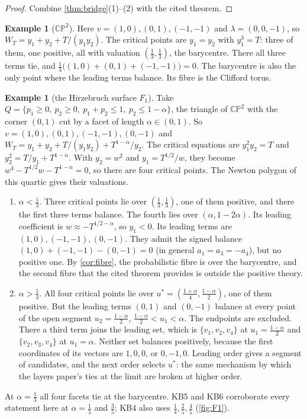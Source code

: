 \documentclass[11pt]{article}
\theoremstyle{definition}\newtheorem{definition}[theorem]{Definition}\newtheorem{remark}[theorem]{Remark}\newtheorem{example}[theorem]{Example}\newtheorem{problem}[theorem]{Open problem}\crefname{problem}{Problem}{Problems}
\begin{document}
\begin{proof}
Combine \cref{thm:bridge}(1)--(2) with the cited theorem.
\end{proof}

\begin{example}[$\mathbb{CP}^2$]\label{ex:CP2}
Here $v=(1,0),(0,1),(-1,-1)$ and $\lambda=(0,0,-1)$, so $W_T=y_1+y_2+T/(y_1y_2)$. The critical points are $y_1=y_2$ with $y_1^3=T$: three of them, one positive, all
with valuation $(\tfrac13,\tfrac13)$, the barycentre. There all three terms tie, and $\tfrac13\bigl((1,0)+(0,1)+(-1,-1)\bigr)=0$. The barycentre is also the only point where
the leading terms balance. Its fibre is the Clifford torus.
\end{example}

\begin{example}[the Hirzebruch surface $F_1$]\label{ex:F1}
Take $Q=\{p_1\ge0,\ p_2\ge0,\ p_1+p_2\le1,\ p_2\le1-\alpha\}$, the triangle of $\mathbb{CP}^2$ with the corner $(0,1)$ cut by a facet of length $\alpha\in(0,1)$. So
$v=(1,0),(0,1),(-1,-1),(0,-1)$ and $W_T=y_1+y_2+T/(y_1y_2)+T^{1-\alpha}/y_2$. The critical equations are $y_1^2y_2=T$ and $y_2^2=T/y_1+T^{1-\alpha}$. With $y_2=w^2$ and
$y_1=T^{1/2}/w$, they become $w^4-T^{1/2}w-T^{1-\alpha}=0$, so there are four critical points. The Newton polygon of this quartic gives their valuations.
\begin{enumerate}
\item[(a)] $\alpha<\tfrac13$. Three critical points lie over $(\tfrac13,\tfrac13)$, one of them positive, and there the first three terms balance. The fourth lies over
  $(\alpha,1-2\alpha)$. Its leading coefficient is $w\approx-T^{1/2-\alpha}$, so $y_1<0$. Its leading terms are $(1,0),(-1,-1),(0,-1)$. They admit the signed
  balance $(1,0)+(-1,-1)-(0,-1)=0$ (in general $a_1=a_3=-a_4$), but no positive one. By \cref{cor:fibre}, the probabilistic fibre is over
  the barycentre, and the second fibre that the cited theorem provides is outside the positive theory.
\item[(b)] $\alpha>\tfrac13$. All four critical points lie over $u^*=(\tfrac{1+\alpha}4,\tfrac{1-\alpha}2)$, one of them positive. But the leading terms $(0,1)$ and $(0,-1)$ balance at every point of
  the open segment $u_2=\tfrac{1-\alpha}2$, $\tfrac{1-\alpha}2<u_1<\alpha$. The endpoints are excluded. There a third term joins the leading set, which is
  $\{v_1,v_2,v_4\}$ at $u_1=\tfrac{1-\alpha}2$ and $\{v_2,v_3,v_4\}$ at $u_1=\alpha$. Neither set balances positively, because the first coordinates of its vectors are $1,0,0$, or
  $0,-1,0$. Leading order gives a segment of candidates, and the next order selects $u^*$: the same mechanism by which the
  layers paper's ties at the limit are broken at higher order.
\end{enumerate}
At $\alpha=\tfrac13$ all four facets tie at the barycentre. KB5 and KB6 corroborate every statement here at $\alpha=\tfrac15$ and $\tfrac35$; KB4 also uses $\tfrac14,\tfrac25,\tfrac45$
(\cref{fig:F1}).
\end{example}
\end{document}
